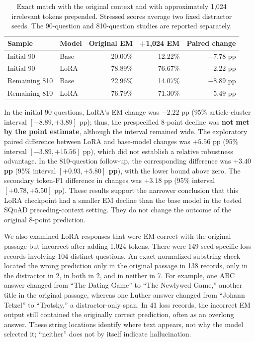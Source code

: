 \begin{table}[t]
\centering
\small
\begin{tabular}{llrrr}
\toprule
Sample & Model & Original EM & +1,024 EM & Paired change \\
\midrule
Initial 90 & Base & 20.00\% & 12.22\% & $-7.78$ pp \\
Initial 90 & LoRA & 78.89\% & 76.67\% & $-2.22$ pp \\
Remaining 810 & Base & 22.96\% & 14.07\% & $-8.89$ pp \\
Remaining 810 & LoRA & 76.79\% & 71.30\% & $-5.49$ pp \\
\bottomrule
\end{tabular}
\caption{Exact match with the original context and with approximately 1,024 irrelevant tokens prepended. Stressed scores average two fixed distractor seeds. The 90-question and 810-question studies are reported separately.}
\label{tab:generalization-em}
\end{table}

In the initial 90 questions, LoRA's EM change was $-2.22$ pp (95\% article-cluster interval $[-8.89,+3.89]$ pp); thus, the prespecified 8-point decline was \textbf{not met by the point estimate}, although the interval remained wide. The exploratory paired difference between LoRA and base-model changes was $+5.56$ pp (95\% interval $[-3.89,+15.56]$ pp), which did not establish a relative robustness advantage. In the 810-question follow-up, the corresponding difference was \textbf{$+3.40$ pp} (95\% interval \textbf{$[+0.93,+5.80]$ pp}), with the lower bound above zero. The secondary token-F1 difference in changes was $+3.18$ pp (95\% interval $[+0.78,+5.50]$ pp). These results support the narrower conclusion that this LoRA checkpoint had a smaller EM decline than the base model in the tested SQuAD preceding-context setting. They do not change the outcome of the original 8-point prediction.

We also examined LoRA responses that were EM-correct with the original passage but incorrect after adding 1,024 tokens. There were 149 seed-specific loss records involving 104 distinct questions. An exact normalized substring check located the wrong prediction only in the original passage in 138 records, only in the distractor in 2, in both in 2, and in neither in 7. For example, one ABC answer changed from ``The Dating Game'' to ``The Newlywed Game,'' another title in the original passage, whereas one Luther answer changed from ``Johann Tetzel'' to ``Trotsky,'' a distractor-only span. In 41 loss records, the incorrect EM output still contained the originally correct prediction, often as an overlong answer. These string locations identify where text appears, not why the model selected it; ``neither'' does not by itself indicate hallucination.

